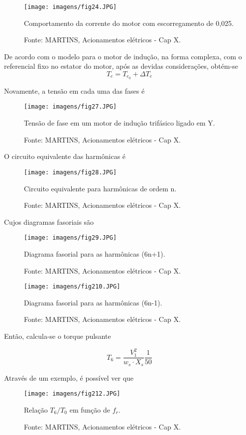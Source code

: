 \begin{figure}[ht!]
\center
\texttt{[image: imagens/fig24.JPG]}
\caption{\label{fig:fig24} Comportamento da corrente do motor com escorregamento de 0,025.}
\caption*{Fonte: MARTINS, Acionamentos elétricos - Cap X.}
\end{figure}

De acordo com o modelo para o motor de indução, na forma complexa, com o referencial fixo no estator do motor, após as devidas considerações, obtém-se
\[ T_e = T_{e_0} + \Delta T_e \]

Novamente, a tensão em cada uma das fases é

\begin{figure}[ht!]
\center
\texttt{[image: imagens/fig27.JPG]}
\caption{\label{fig:fig27} Tensão de fase em um motor de indução trifásico ligado em Y.}
\caption*{Fonte: MARTINS, Acionamentos elétricos - Cap X.}
\end{figure}

O circuito equivalente das harmônicas é

\begin{figure}[ht!]
\center
\texttt{[image: imagens/fig28.JPG]}
\caption{\label{fig:fig28} Circuito equivalente para harmônicas de ordem n.}
\caption*{Fonte: MARTINS, Acionamentos elétricos - Cap X.}
\end{figure}

Cujos diagramas fasoriais são

\begin{figure}[ht!]
\center
\texttt{[image: imagens/fig29.JPG]}
\caption{\label{fig:fig29} Diagrama fasorial para as harmônicas (6n+1).}
\caption*{Fonte: MARTINS, Acionamentos elétricos - Cap X.}
\end{figure}

\begin{figure}[ht!]
\center
\texttt{[image: imagens/fig210.JPG]}
\caption{\label{fig:fig210} Diagrama fasorial para as harmônicas (6n-1).}
\caption*{Fonte: MARTINS, Acionamentos elétricos - Cap X.}
\end{figure}

Então, calcula-se o torque pulsante

\[ T_6 = \frac{V_1 ^2}{w_s \cdot X_s}\frac{1}{50}  \]

Através de um exemplo, é possível ver que

\begin{figure}[ht!]
\center
\texttt{[image: imagens/fig212.JPG]}
\caption{\label{fig:fig212} Relação $T_{6}/T_{0}$ em função de $f_{r}$.}
\caption*{Fonte: MARTINS, Acionamentos elétricos - Cap X.}
\end{figure}

